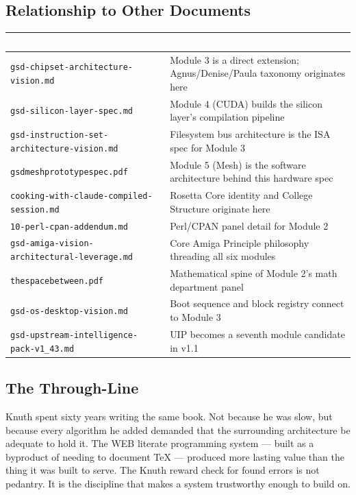 \documentclass[11pt,letterpaper]{article}
\newcommand{\tableheader}[1]{\textbf{\sffamily\textcolor{white}{#1}}}
\begin{document}
\subsection{Relationship to Other Documents}

\begin{center}
\begin{tabularx}{\textwidth}{L{4.5cm}X}
\toprule
{}
\tableheader{Document} & \tableheader{Relationship} \\
\midrule
\texttt{gsd-chipset-architecture-vision.md} & Module 3 is a direct extension; Agnus/Denise/Paula taxonomy originates here \\
\texttt{gsd-silicon-layer-spec.md} & Module 4 (CUDA) builds the silicon layer's compilation pipeline \\
\texttt{gsd-instruction-set-architecture-vision.md} & Filesystem bus architecture is the ISA spec for Module 3 \\
\texttt{gsdmeshprototypespec.pdf} & Module 5 (Mesh) is the software architecture behind this hardware spec \\
\texttt{cooking-with-claude-compiled-session.md} & Rosetta Core identity and College Structure originate here \\
\texttt{10-perl-cpan-addendum.md} & Perl/CPAN panel detail for Module 2 \\
\texttt{gsd-amiga-vision-architectural-leverage.md} & Core Amiga Principle philosophy threading all six modules \\
\texttt{thespacebetween.pdf} & Mathematical spine of Module 2's math department panel \\
\texttt{gsd-os-desktop-vision.md} & Boot sequence and block registry connect to Module 3 \\
\texttt{gsd-upstream-intelligence-pack-v1\_43.md} & UIP becomes a seventh module candidate in v1.1 \\
\bottomrule
\end{tabularx}
\end{center}

\subsection{The Through-Line}

Knuth spent sixty years writing the same book. Not because he was slow, but because every algorithm he added demanded that the surrounding architecture be adequate to hold it. The WEB literate programming system --- built as a byproduct of needing to document TeX --- produced more lasting value than the thing it was built to serve. The Knuth reward check for found errors is not pedantry. It is the discipline that makes a system trustworthy enough to build on.
\end{document}
